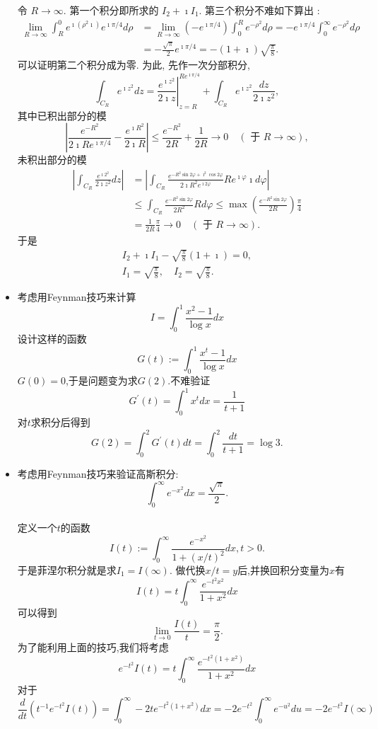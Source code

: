 \begin{itemize}
令 $R \rightarrow \infty$. 第一个积分即所求的 $I_2+\imath I_1$. 第三个积分不难如下算出 :
$$
\begin{aligned}
\lim _{R \rightarrow \infty} \int_R^0 e^{\imath\left(\rho^2 \imath\right)} e^{\imath \pi / 4} d \rho & =\lim _{R \rightarrow \infty}\left(-e^{\imath \pi / 4}\right) \int_0^R e^{-\rho^2} d \rho=-e^{\imath \pi / 4} \int_0^{\infty} e^{-\rho^2} d \rho \\
& =-\frac{\sqrt{\pi}}{2} e^{\imath \pi / 4}=-(1+\imath) \sqrt{\frac{\pi}{8}} .
\end{aligned}
$$
可以证明第二个积分成为零. 为此, 先作一次分部积分,
$$
\int_{C_R} e^{\imath z^2} d z=\left.\frac{e^{\imath z^2}}{2 \imath z}\right|_{z=R} ^{R e^{\imath \pi / 4}}+\int_{C_R} e^{\imath z^2} \frac{d z}{2 \imath z^2},
$$
其中已积出部分的模
$$
\left|\frac{e^{-R^2}}{2 \imath R e^{\imath \pi / 4}}-\frac{e^{\imath R^2}}{2 \imath R}\right| \leqslant \frac{e^{-R^2}}{2 R}+\frac{1}{2 R} \rightarrow 0 \quad(\text { 于 } R \rightarrow \infty),
$$
未积出部分的模
$$
\begin{aligned}
\left|\int_{C_R} \frac{e^{\imath 2^2}}{2 \imath {z}^2} d z\right| & =\left|\int_{C_R} \frac{e^{-R^2 \sin 2 \varphi+\imath^2 \cos 2 \varphi}}{2 \imath R^2 e^{\imath 2 \varphi}} R e^{\imath \varphi} \imath d \varphi\right| \\
& \leqslant \int_{C_R} \frac{e^{-R^2 \sin 2 \varphi}}{2 R^2} R d \varphi \leqslant \max \left(\frac{e^{-R^2 \sin 2 \varphi}}{2 R}\right) \frac{\pi}{4}
\\
&=\frac{1}{2 R} \frac{\pi}{4} \rightarrow 0 \quad(\text { 于 } R \rightarrow \infty) .
\end{aligned}
$$
于是
$$
\begin{gathered}
I_2+\imath I_1-\sqrt{\frac{\pi}{8}}(1+\imath)=0, \\
I_1=\sqrt{\frac{\pi}{8}}, \quad I_2=\sqrt{\frac{\pi}{8}} .
\end{gathered}
$$
\item 考虑用Feynman技巧来计算
$$
I = \int_0^1 \frac{x^2-1}{\log x} d x
$$
设计这样的函数
$$
G(t):=\int_0^1 \frac{x^t-1}{\log x} d x
$$
$G(0) = 0$,于是问题变为求$G(2)$.不难验证
$$
G^{\prime}(t)=\int_0^1 x^t d x=\frac{1}{t+1}
$$
对$t$求积分后得到
$$
G(2)=\int_0^2 G^{\prime}(t) d t=\int_0^2 \frac{d t}{t+1}=\log 3.
$$

\item 考虑用Feynman技巧来验证高斯积分:
$$
\int_0^{\infty} e^{-x^2} d x = \frac{\sqrt{\pi}}{2}.
$$
\\
定义一个$t$的函数
$$
I(t):=\int_0^{\infty} \frac{e^{-x^2}}{1+(x / t)^2} d x, t>0. 
$$
于是菲涅尔积分就是求$I_1 = I(\infty)$.
做代换$x/t=y$后,并换回积分变量为$x$有 $$
I(t)=t \int_0^{\infty} \frac{e^{-t^2 x^2}}{1+x^2} d x
$$
可以得到 $$
\lim _{t \rightarrow 0} \frac{I(t)}{t}=\frac{\pi}{2}.
$$
为了能利用上面的技巧,我们将考虑
$$
e^{-t^2} I(t)=t \int_0^{\infty} \frac{e^{-t^2\left(1+x^2\right)}}{1+x^2} d x
$$
对于
$$
\frac{d}{d t}\left(t^{-1} e^{-t^2} I(t)\right)=\int_0^{\infty}-2 t e^{-t^2\left(1+x^2\right)} d x=-2 e^{-t^2} \int_0^{\infty} e^{-u^2} d u=-2 e^{-t^2} I(\infty)
$$


\end{itemize}
